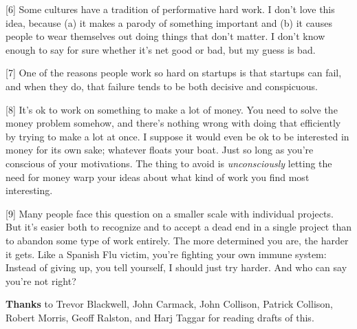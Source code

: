 {[}6{]} Some cultures have a tradition of performative hard work. I
don't love this idea, because (a) it makes a parody of something
important and (b) it causes people to wear themselves out doing things
that don't matter. I don't know enough to say for sure whether it's net
good or bad, but my guess is bad.

{[}7{]} One of the reasons people work so hard on startups is that
startups can fail, and when they do, that failure tends to be both
decisive and conspicuous.

{[}8{]} It's ok to work on something to make a lot of money. You need to
solve the money problem somehow, and there's nothing wrong with doing
that efficiently by trying to make a lot at once. I suppose it would
even be ok to be interested in money for its own sake; whatever floats
your boat. Just so long as you're conscious of your motivations. The
thing to avoid is \emph{unconsciously} letting the need for money warp
your ideas about what kind of work you find most interesting.

{[}9{]} Many people face this question on a smaller scale with
individual projects. But it's easier both to recognize and to accept a
dead end in a single project than to abandon some type of work entirely.
The more determined you are, the harder it gets. Like a Spanish Flu
victim, you're fighting your own immune system: Instead of giving up,
you tell yourself, I should just try harder. And who can say you're not
right?

\textbf{Thanks} to Trevor Blackwell, John Carmack, John Collison,
Patrick Collison, Robert Morris, Geoff Ralston, and Harj Taggar for
reading drafts of this.
